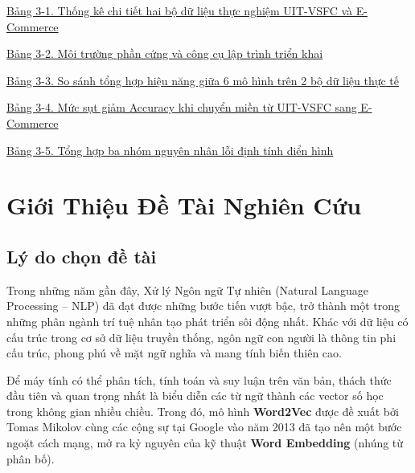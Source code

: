 \documentclass[12pt,a4paper]{article}
\begin{document}
\noindent\hyperref[tab:dataset_stats]{Bảng 3-1. Thống kê chi tiết hai bộ dữ liệu thực nghiệm UIT-VSFC và E-Commerce \dotfill \pageref*{tab:dataset_stats}}\par\vspace{6pt}
\noindent\hyperref[tab:env_stats]{Bảng 3-2. Môi trường phần cứng và công cụ lập trình triển khai \dotfill \pageref*{tab:env_stats}}\par\vspace{6pt}
\noindent\hyperref[tab:results_comparison]{Bảng 3-3. So sánh tổng hợp hiệu năng giữa 6 mô hình trên 2 bộ dữ liệu thực tế \dotfill \pageref*{tab:results_comparison}}\par\vspace{6pt}
\noindent\hyperref[tab:domain_gap]{Bảng 3-4. Mức sụt giảm Accuracy khi chuyển miền từ UIT-VSFC sang E-Commerce \dotfill \pageref*{tab:domain_gap}}\par\vspace{6pt}
\noindent\hyperref[tab:error_summary]{Bảng 3-5. Tổng hợp ba nhóm nguyên nhân lỗi định tính điển hình \dotfill \pageref*{tab:error_summary}}\par

\newpage
{}
\setcounter{page}{1}

\section{Giới Thiệu Đề Tài Nghiên Cứu}\label{sec:chuong1}

\subsection{Lý do chọn đề tài}\label{sec:ly_do_chon_de_tai}
Trong những năm gần đây, Xử lý Ngôn ngữ Tự nhiên (Natural Language Processing -- NLP) đã đạt được những bước tiến vượt bậc, trở thành một trong những phân ngành trí tuệ nhân tạo phát triển sôi động nhất. Khác với dữ liệu có cấu trúc trong cơ sở dữ liệu truyền thống, ngôn ngữ con người là thông tin phi cấu trúc, phong phú về mặt ngữ nghĩa và mang tính biến thiên cao.

Để máy tính có thể phân tích, tính toán và suy luận trên văn bản, thách thức đầu tiên và quan trọng nhất là biểu diễn các từ ngữ thành các vector số học trong không gian nhiều chiều. Trong đó, mô hình \textbf{Word2Vec} được đề xuất bởi Tomas Mikolov cùng các cộng sự tại Google vào năm 2013 \cite{mikolov2013efficient, mikolov2013distributed} đã tạo nên một bước ngoặt cách mạng, mở ra kỷ nguyên của kỹ thuật \textbf{Word Embedding} (nhúng từ phân bố).
\end{document}
